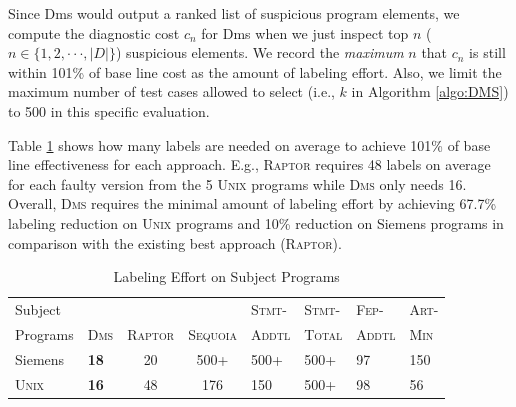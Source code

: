 
Since Dms would output a ranked list of suspicious program elements, we compute the diagnostic cost $c_n$ for {\sc Dms} when we just inspect top $n$ ($n \in \{1,2,\cdot \cdot \cdot, |D|\}$) suspicious elements. We record the {\em maximum} $n$ that $c_n$ is still within 101\% of base line cost as the amount of labeling effort. Also, we limit the maximum number of test cases allowed to select (i.e., $k$ in Algorithm \ref{algo:DMS}) to 500 in this specific evaluation.

Table \ref{tab:label_effort} shows how many labels are needed on average to achieve 101\% of base line effectiveness
for each approach.
E.g., \textsc{Raptor} requires 48 labels on average for each faulty version from the 5 \textsc{Unix} programs while \textsc{Dms} only needs 16.
Overall, \textsc{Dms} requires the minimal amount of labeling effort by achieving 67.7\% labeling reduction on \textsc{Unix}
programs and 10\% reduction on Siemens programs in comparison with the existing best approach (\textsc{Raptor}).

\begin{table}[tbp]
	\centering
	\caption{Labeling Effort on Subject Programs}
{
	\scriptsize
		\renewcommand{\arraystretch}{1.5}
        \begin{tabular}{|m{32pt}|m{13pt}|c|c|m{21pt}|m{21pt}|m{21pt}|m{17pt}|}
		   \hline
		     Subject &             &                &                  & \textsc{Stmt-} & \textsc{Stmt-} & \textsc{Fep-}  & \textsc{Art-} \\
		   Programs & \textsc{Dms} & \textsc{Raptor}  & \textsc{Sequoia} & \textsc{Addtl} & \textsc{Total} & \textsc{Addtl} & \textsc{Min} \\
		   \hline\hline
		   Siemens &   {\bf 18} &         20 &       500\tiny{+} &       500\tiny{+} &       500\tiny{+} &         97 &        150 \\
		   \hline
			\textsc{Unix} &   {\bf 16} &         48 &    176 &        150 &       500\tiny{+} &         98 &         56 \\
		   \hline
		\end{tabular}
}
	\label{tab:label_effort}
\end{table}


